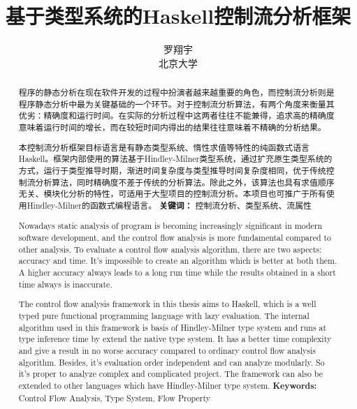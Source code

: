 \documentclass[12pt, titlepage]{article}
\title{基于类型系统的Haskell控制流分析框架}
\author{罗翔宇\\北京大学}
\begin{document}
	\maketitle
	\renewcommand{\abstractname}{摘要}
	\begin{abstract}
	
	程序的静态分析在现在软件开发的过程中扮演者越来越重要的角色，而控制流分析则是程序静态分析中最为关键基础的一个环节。对于控制流分析算法，有两个角度来衡量其优劣：精确度和运行时间。在实际的分析过程中这两者往往不能兼得，追求高的精确度意味着运行时间的增长，而在较短时间内得出的结果往往意味着不精确的分析结果。
	
	本控制流分析框架目标语言是有静态类型系统、惰性求值等特性的纯函数式语言Haskell。框架内部使用的算法基于Hindley-Milner类型系统，通过扩充原生类型系统的方式，运行于类型推导时期，渐进时间复杂度与类型推导时间复杂度相同，优于传统控制流分析算法，同时精确度不差于传统的分析算法。除此之外，该算法也具有求值顺序无关、模块化分析的特性，可适用于大型项目的控制流分析。本项目也可推广于所有使用Hindley-Milner的函数式编程语言。
	\vfill
	\noindent\textbf{关键词：} 控制流分析、类型系统、流属性
	\end{abstract}
	\renewcommand{\abstractname}{Abstract}
	\begin{abstract}
	
	Nowadays static analysis of program is becoming increasingly significant in modern software development, and the control flow analysis is more fundamental compared to other analysis. To evaluate a control flow analysis algorithm, there are two aspects: accuracy and time. It's impossible to create an algorithm which is better at both them. A higher accuracy always leads to a long run time while the results obtained in a short time always is inaccurate.
	
	The control flow analysis framework in this thesis aims to Haskell, which is a well typed pure functional programming language with lazy evaluation. The internal algorithm used in this framework is basis of Hindley-Milner type system and runs at type inference time by extend the native type system. It has a better time complexity and give a result in no worse accuracy compared to ordinary control flow analysis algorithm. Besides, it's evaluation order independent and can analyze modularly. So it's proper to analyze complex and complicated project. The framework can also be extended to other languages which have Hindley-Milner type system.
	\vfill
	\noindent\textbf{Keywords:} Control Flow Analysis, Type System, Flow Property
	\end{abstract}
	\tableofcontents
	\newpage
\end{document}
